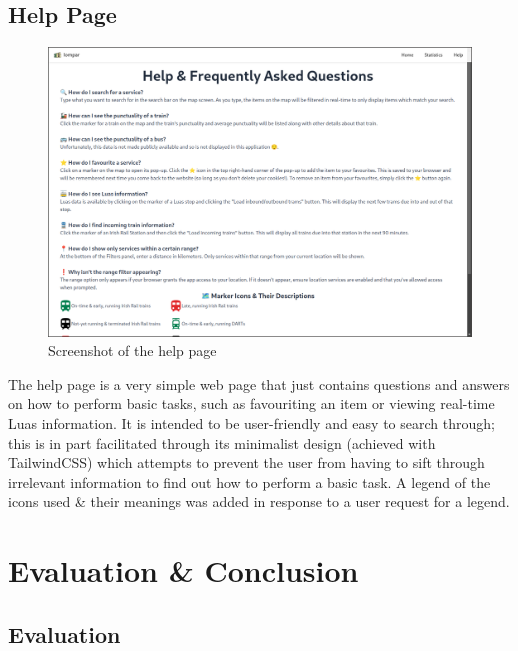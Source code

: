 \documentclass[a4paper,11pt]{report}
\begin{document}
\section{Help Page}
\begin{figure}[H]
    \centering
    \includegraphics[width=\textwidth]{./images/helppage.png}
    \caption{Screenshot of the help page}
\end{figure}

The help page is a very simple web page that just contains questions and answers on how to perform basic tasks, such as favouriting an item or viewing real-time Luas information.
It is intended to be user-friendly and easy to search through; 
this is in part facilitated through its minimalist design (achieved with TailwindCSS) which attempts to prevent the user from having to sift through irrelevant information to find out how to perform a basic task.
A legend of the icons used \& their meanings was added in response to a user request for a legend.

\chapter{Evaluation \& Conclusion}
\section{Evaluation}
\end{document}
